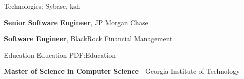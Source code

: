 \documentclass[MMMMyyyy,nonstopmode]{simpleresumecv_stacked}
\newif\ifNOTSELECTED
\begin{document}
\begin{Body}
\begin{Detail}
\Gap
Technologies: Sybase, ksh
\end{Detail}
\fi

\else

\iffalse %
\BigGap
\Entry
\href{http://www.paychex.com/}
{\textbf{Paychex}}

\begin{Detail}
	Led team of 5 to create three public-facing fullstack Java/JavaScript applications.

	Created CI/CD deployment pipelines with Hudson.
\end{Detail}
\fi %


\ifNOTSELECTED
\begin{Detail}
Created applications to build DSL circuits and track sales commissions in Java and SQL.
\end{Detail}
\fi %

\ifNOTSELECTED
\Gap
\Entry
\textbf{Senior Software Engineer}, Global Crossing/Level3

\begin{Detail}
Led multi-site teams to create telecom applications in Java and SQL.
\end{Detail}
\fi %

\Entry
\textbf{Senior Software Engineer}, JP Morgan Chase
\ifNOTSELECTED
\begin{Detail}
Created trading systems for equity derivatives and HFT trading desks in C, C++, and Excel.
\end{Detail}
\fi %

\Entry
\textbf{Software Engineer}, BlackRock Financial Management
\ifNOTSELECTED
\begin{Detail}
Developed systems for MBS mortgage, Treasury, and Repo trading desks in C and C++.
\end{Detail}
\fi %
\fi %
%

\Section
{Education}
{Education}
{PDF:Education}

\Entry
\textbf{Master of Science in Computer Science} -
Georgia Institute of Technology


\end{Body}
\end{document}
